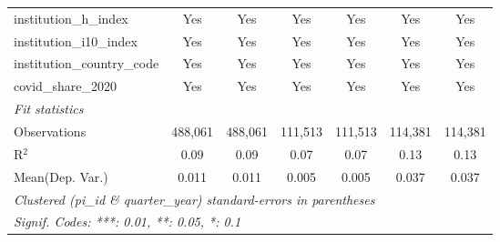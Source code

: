 \begin{tabular}{lcccccc}
   institution\_h\_index                                       & Yes           & Yes            & Yes           & Yes            & Yes           & Yes\\  
   institution\_i10\_index                                     & Yes           & Yes            & Yes           & Yes            & Yes           & Yes\\  
   institution\_country\_code                                  & Yes           & Yes            & Yes           & Yes            & Yes           & Yes\\  
   covid\_share\_2020                                          & Yes           & Yes            & Yes           & Yes            & Yes           & Yes\\  
   \midrule
   \emph{Fit statistics}\\
   Observations                                                & 488,061       & 488,061        & 111,513       & 111,513        & 114,381       & 114,381\\  
   R$^2$                                                       & 0.09          & 0.09           & 0.07          & 0.07           & 0.13          & 0.13\\  
Mean(Dep. Var.) & 0.011 & 0.011 & 0.005 & 0.005 & 0.037 & 0.037 \\
   \midrule \midrule
   \multicolumn{7}{l}{\emph{Clustered (pi\_id \& quarter\_year) standard-errors in parentheses}}\\
   \multicolumn{7}{l}{\emph{Signif. Codes: ***: 0.01, **: 0.05, *: 0.1}}\\
\end{tabular}
\par\endgroup
